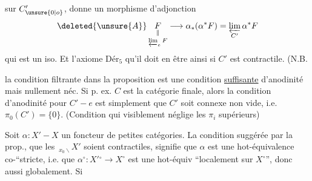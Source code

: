 sur $C'_{\unsure{0|o}}$,  donne un morphisme d'adjonction
\[
 \deleted{\unsure{A}}\,\underset{\varprojlim_e F}{\underset{\Vert}{F}}\longrightarrow\alpha_*(\alpha^* F)=\varprojlim_{C'}\alpha^*F
\]
 qui est un iso. Et l'axiome $\mathrm{Dér}_{5}$   qu'il doit en être ainsi si $C'$ est contractile. (N.B.
\diagram{\begin{tikzcd}[ampersand replacement=\&,row sep=tiny,column sep=tiny]
\&\deleted{\cdot}\arrow[d]\\\deleted{\cdot}\arrow[r]\&\deleted{\cdot}
\end{tikzcd}}

la condition  filtrante dans la proposition  est  une condition \uline{suffisante} d'anodinité mais nullement néc. Si p. ex. $C$ est la catégorie finale, alors la condition d'anodinité pour $C'-e$ est simplement que $C'$ soit connexe non vide,  i.e. $\pi_0(C')=\{0\}$. (Condition qui visiblement néglige les $\pi_i$ supérieurs)

Soit $\boxed{\alpha:X'-X}$ un foncteur de petites catégories. La condition suggérée par la prop., que les $\,{}_{x_0\backslash}X'$ soient contractiles, signifie que $\alpha$ est une hot-équivalence co-``stricte, i.e. que $\alpha^\circ:X'{}^\circ\to X^\circ$ est une hot-équiv ``localement sur $X^\circ$'', donc aussi globalement. Si \deleted{\unsure{$\alpha$}}
